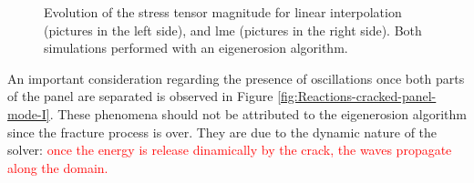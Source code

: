 \documentclass[preprint,12pt,a4paper]{elsarticle}
\newcommand{\PNA}[1]{
  \textcolor{red}{{#1}}
}
\begin{document}
\begin{figure}
\centering
{}
\caption{Evolution of the stress tensor magnitude for linear
  interpolation (pictures in the left side), and \acrshort{lme}
  (pictures in the right side). Both simulations performed with an
  eigenerosion algorithm.}
\label{fig:Stress-cracked-panel-mode-I}
\end{figure}
An important consideration regarding the presence of oscillations once
both parts of the panel are separated is observed in Figure
\ref{fig:Reactions-cracked-panel-mode-I}. These phenomena should not be
attributed to the eigenerosion algorithm since the fracture process is
over. They are due to the dynamic nature of the solver: \PNA{once the
  energy is release dinamically by the crack, the waves propagate
  along the domain.}
\end{document}

